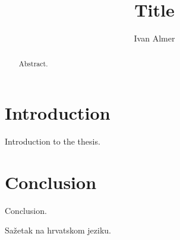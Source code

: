 \documentclass[times, utf8, diplomski]{fer}
\begin{document}
\renewcommand*\contentsname{Table of contents}


\title{Title}

\author{Ivan Almer}

\maketitle


\zahvala{}

\tableofcontents

\chapter{Introduction}
Introduction to the thesis.

\chapter{Conclusion}
Conclusion.



\nocite{*}

\begin{sazetak}
Sažetak na hrvatskom jeziku.

\end{sazetak}

\begin{abstract}
Abstract.

\end{abstract}
\end{document}
